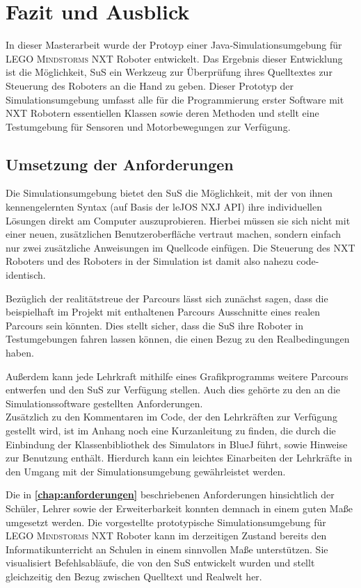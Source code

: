 \documentclass[paper=a4, DIV=calc, BCOR=12mm, twoside=on, onecolumn=on, open = right, titlepage =on, parskip =half-, headsepline = on, footsepline = off, chapterprefix = off, appendixprefix = on, fontsize = 12pt, numbers = noenddot, abstract = on]{scrbook}
\begin{document}
\newpage
\chapter{Fazit und Ausblick}

\onehalfspacing

In dieser Masterarbeit wurde der Protoyp einer Java-Simulations\-um\-ge\-bung für \textsc{LEGO Mindstorms} NXT Roboter entwickelt. Das Ergebnis dieser Entwicklung ist die Möglichkeit, SuS ein Werkzeug zur Überprüfung ihres Quelltextes zur Steuerung des Roboters an die Hand
zu geben. Dieser Prototyp der Simulationsumgebung umfasst alle für die
Programmierung erster Software mit NXT Robotern essentiellen Klassen sowie deren Methoden und stellt eine Testumgebung für Sensoren und Motorbewegungen zur Verfügung.


\section{Umsetzung der Anforderungen}

Die Simulationsumgebung bietet den SuS die Möglichkeit, mit der von ihnen kennengelernten Syntax (auf Basis der leJOS NXJ API) ihre individuellen Lösungen direkt am Computer auszuprobieren. Hierbei müssen sie sich nicht mit einer neuen, zusätzlichen Benutzeroberfläche vertraut machen, sondern einfach nur zwei zusätzliche Anweisungen im Quellcode einfügen. Die Steuerung des NXT Roboters und des Roboters in der Simulation ist damit also nahezu code-identisch.

Bezüglich der realitätstreue der Parcours lässt sich zunächst sagen, dass die beispielhaft im Projekt mit enthaltenen Parcours Ausschnitte eines realen Parcours sein könnten. Dies stellt sicher, dass die SuS ihre Roboter in Testumgebungen fahren lassen können, die einen Bezug zu den Realbedingungen haben.

Außerdem kann jede Lehrkraft mithilfe eines Grafikprogramms weitere Parcours entwerfen und den SuS zur Verfügung stellen. Auch dies gehörte zu den an die Simulationssoftware gestellten Anforderungen.\\ 
Zusätzlich zu den Kommentaren im Code, der den Lehrkräften zur Verfügung gestellt wird, ist im Anhang noch eine Kurzanleitung zu finden, die durch die Einbindung der Klassenbibliothek des Simulators in BlueJ führt, sowie Hinweise zur Benutzung enthält. Hierdurch kann ein leichtes Einarbeiten der Lehrkräfte in den Umgang mit der Simulationsumgebung gewährleistet werden. 

Die in \textbf{\ref{chap:anforderungen}} beschriebenen Anforderungen hinsichtlich der Schüler, Lehrer sowie der Erweiterbarkeit konnten demnach in einem guten Maße umgesetzt werden. Die vorgestellte prototypische Simulationsumgebung für \textsc{LEGO Mindstorms} NXT Roboter kann im derzeitigen Zustand bereits den Informatikunterricht an Schulen in einem sinnvollen Maße unterstützen. Sie visualisiert Befehlsabläufe, die von den SuS entwickelt wurden und stellt gleichzeitig den Bezug zwischen Quelltext und Realwelt her. 
\end{document}
